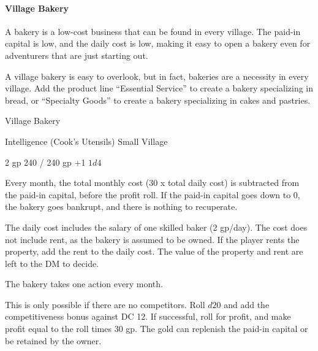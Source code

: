 \documentclass[twocolumn]{dndbook}
\begin{document}
\paragraph{Village Bakery}

A bakery is a low-cost business that can be found in every village.
The paid-in capital is low, and the daily cost is low,
making it easy to open a bakery even for adventurers that are just starting out.\par

A village bakery is easy to overlook, but in fact, bakeries are a necessity in every village.
Add the product line ``Essential Service'' to create a bakery specializing in bread,
or ``Specialty Goods'' to create a bakery specializing in cakes and pastries.\par

\begin{DndMonster}[width=.5\textwidth - 8pt]{Village Bakery}

	\hfill Intelligence (Cook's Utensils)
	\hfill Small Village


	\hfill 2 gp
	\hfill 240 / 240 gp
	\hfill +1
	\hfill $1d4$

	Every month, the total monthly cost (30 x total daily cost) is subtracted
	from the paid-in capital, before the profit roll.
	If the paid-in capital goes down to 0, the bakery goes bankrupt,
	and there is nothing to recuperate.\par

	The daily cost includes the salary of one skilled baker (2 gp/day).
	The cost does not include rent, as the bakery is assumed to be owned.
	If the player rents the property, add the rent to the daily cost.
	The value of the property and rent are left to the DM to decide.\par

	The bakery takes one action every month.

	This is only possible if there are no competitors.
	Roll $d20$ and add the competitiveness bonus against DC 12.
	If successful, roll for profit, and make profit equal to the roll
	times 30 gp. The gold can replenish the paid-in capital or be retained by the owner.


\end{DndMonster}
\end{document}
